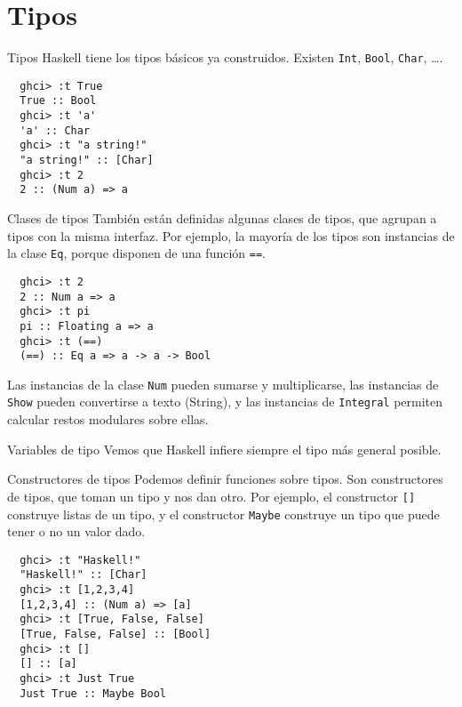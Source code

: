 \section{Tipos}

\begin{frame}[fragile]{Tipos}
  Haskell tiene los tipos básicos ya construidos. Existen
  \texttt{Int}, \texttt{Bool}, \texttt{Char}, \dots.
  \begin{lstlisting}
  ghci> :t True
  True :: Bool
  ghci> :t 'a'
  'a' :: Char
  ghci> :t "a string!"
  "a string!" :: [Char]
  ghci> :t 2
  2 :: (Num a) => a
  \end{lstlisting}
\end{frame}


\begin{frame}[fragile]{Clases de tipos}
  También están definidas algunas clases de tipos, que agrupan a tipos con la misma interfaz.
  Por ejemplo, la mayoría de los tipos son instancias de la clase \texttt{Eq}, porque
  disponen de una función \texttt{==}.

  \begin{lstlisting}
  ghci> :t 2
  2 :: Num a => a
  ghci> :t pi
  pi :: Floating a => a
  ghci> :t (==)
  (==) :: Eq a => a -> a -> Bool
  \end{lstlisting}

  Las instancias
  de la clase \texttt{Num} pueden sumarse y multiplicarse, las instancias de \texttt{Show}
  pueden convertirse a texto (String), y las instancias de \texttt{Integral} permiten
  calcular restos modulares sobre ellas.
\end{frame}


\begin{frame}[fragile]{Variables de tipo}
  Vemos que Haskell infiere siempre el tipo más general posible.
\end{frame}


\begin{frame}[fragile]{Constructores de tipos}
  Podemos definir funciones
  sobre tipos. Son constructores de tipos, que toman un tipo y nos dan otro.
  \espacio
  Por ejemplo, el constructor \texttt{[]} construye listas de un tipo, y el
  constructor \texttt{Maybe} construye un tipo que puede tener o no un valor dado.

  \begin{lstlisting}
  ghci> :t "Haskell!"
  "Haskell!" :: [Char]
  ghci> :t [1,2,3,4]
  [1,2,3,4] :: (Num a) => [a]
  ghci> :t [True, False, False]
  [True, False, False] :: [Bool]
  ghci> :t []
  [] :: [a]
  ghci> :t Just True
  Just True :: Maybe Bool
  \end{lstlisting}
\end{frame}
